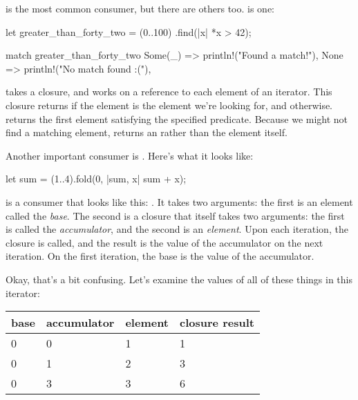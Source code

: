 \blank

 is the most common consumer, but there are others too.  is one:

\begin{rustc}
let greater_than_forty_two = (0..100)
                             .find(|x| *x > 42);

match greater_than_forty_two {
    Some(_) => println!("Found a match!"),
    None => println!("No match found :("),
}
\end{rustc}

 takes a closure, and works on a reference to each element of an iterator. This closure returns  if the 
element is the element we're looking for, and  otherwise.  returns the first element satisfying the 
specified predicate. Because we might not find a matching element,  returns an  rather than the element itself.

\blank

Another important consumer is . Here's what it looks like:

\begin{rustc}
let sum = (1..4).fold(0, |sum, x| sum + x);
\end{rustc}

 is a consumer that looks like this: . It takes two arguments: the first 
is an element called the \emph{base}. The second is a closure that itself takes two arguments: the first is called the \emph{accumulator}, 
and the second is an \emph{element}. Upon each iteration, the closure is called, and the result is the value of the accumulator on the 
next iteration. On the first iteration, the base is the value of the accumulator.

\blank

Okay, that's a bit confusing. Let's examine the values of all of these things in this iterator:

\begin{table}[H]
  \begin{tabular}{|l|l|l|l|}
  \hline
  \textbf{base} & \textbf{accumulator} & \textbf{element} & \textbf{closure result} \\
  \hline
  0 & 0 & 1 & 1 \\
  \hline
  0 & 1 & 2 & 3 \\
  \hline
  0 & 3 & 3 & 6 \\
  \hline
  \end{tabular}
\end{table}

